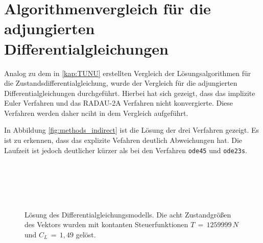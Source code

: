 \chapter{Algorithmenvergleich für die adjungierten Differentialgleichungen}\label{appendix:methods}
Analog zu dem in \autoref{kap:TUNU} erstellten Vergleich der Lösungsalgorithmen für die Zustandsdifferentialgleichung, wurde der Vergleich für die adjungierten Differentialgleichungen durchgeführt.
Hierbei hat sich gezeigt, dass das implizite Euler Verfahren und das RADAU-2A Verfahren nicht konvergierte. Diese Verfahren werden daher nciht in dem Vergleich aufgeführt.

In Abbildung \autoref{fig:methods_indirect} ist die Lösung der drei Verfahren gezeigt. Es ist zu erkennen, dass das explizite Vefahren deutlich Abweichungen hat. Die Laufzeit ist jedoch deutlicher kürzer als bei den Verfahren \verb+ode45+ und \verb+ode23s+.

\begin{figure}[htbp]
    \centering 
    \qquad
     \\

    \qquad
     \\

    \qquad
     \\

    \qquad
     \\

    \caption{Lösung des Differentialgleichungsmodells. Die acht Zustandgrößen des Vektors wurden mit kontanten Steuerfunktionen \(T\,=\,1259999\,N\) und \(C_L\,=\,1,49\) gelöst.} \label{fig:methods_indirect}
\end{figure}

